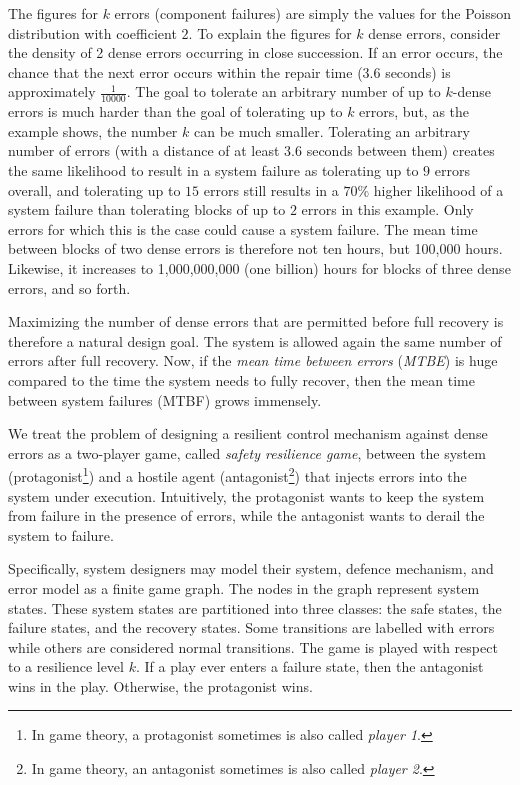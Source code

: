 The figures for $k$ errors (component failures) are simply the values for the Poisson distribution with coefficient $2$.
To explain the figures for $k$ dense errors, consider the density of 2 dense errors occurring in close succession.
If an error occurs, the chance that the next error occurs within the repair time (3.6 seconds) is approximately $\frac{1}{10000}$.
The goal to tolerate an arbitrary number of up to $k$-dense errors is much harder than the goal of tolerating up to $k$ errors, but, as the example shows, the number $k$ can be much smaller.   
Tolerating an arbitrary number of errors (with a distance of at least $3.6$ seconds between them) creates the same likelihood to result in a system failure as tolerating up to $9$ errors overall, and tolerating up to $15$ errors still results in a $70\%$ higher likelihood of a system failure than tolerating blocks of up to $2$ errors in this example. 
Only errors for which this is the case could cause a system failure.
The mean time between blocks of two dense errors is therefore not ten hours, but 100,000 hours.
Likewise, it increases to 1,000,000,000 (one billion) hours for blocks of three dense errors, and so forth.

Maximizing the number of dense errors that are permitted before full recovery is therefore a natural design goal.  
The system is allowed again the same number of errors after full recovery.
Now, if the {\em mean time between errors} ({\em MTBE}) is huge compared to the time the system needs to fully recover, then the mean time between system failures (MTBF) grows immensely. 

We treat the problem of designing a resilient control mechanism against dense errors as a two-player game, called {\em safety resilience game}, between the system (protagonist\footnote{In game theory, a protagonist sometimes is also called {\em player 1}.}) and a hostile agent (antagonist\footnote{In game theory, an antagonist sometimes is also called {\em player 2}.}) that injects errors into the system under execution.
Intuitively, the protagonist wants to keep the system from failure in the presence of errors, while the antagonist wants to derail the system to failure.

Specifically, system designers may model their system, defence mechanism, and error model as a finite game graph.
The nodes in the graph represent system states.
These system states are partitioned into three classes: the safe states, the failure states, and the recovery states. 
Some transitions are labelled with errors while others are considered normal transitions.
The game is played with respect to a resilience level $k$.
If a play ever enters a failure state, then the antagonist wins in the play.  
Otherwise, the protagonist wins.

